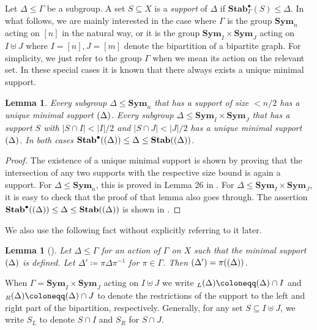 \documentclass[10pt,a4paper]{article}
\theoremstyle{definition}
\theoremstyle{plain}
\newtheorem{lemma}[definition]{Lemma}
\theoremstyle{remark}
\newcommand{\Sym}{\mathbf{Sym}}
\newcommand{\Stab}{\mathbf{Stab}}
\newcommand{\StabP}{\Stab^{\bullet}}
\let\sup\relax
\DeclareMathOperator{\sup}{sup}
\begin{document}
Let $\Delta \leq \Gamma$ be a subgroup. A set $S \subseteq X$
is a \emph{support} of $\Delta$ if $\StabP_\Gamma(S) \leq
\Delta$.  In what follows, we are mainly interested in the
case where $\Gamma$ is the group $\Sym_n$ acting on $[n]$ in
the natural way, or it is the group $\Sym_I \times \Sym_J$
acting on $I \uplus J$ where $I = [n], J = [m]$ denote the bipartition of a bipartite graph.  For
simplicity, we just refer to the group $\Gamma$ when we mean
its action on the relevant set.  In these special cases it is known that there always exists a unique minimal support.
\begin{lemma}
	\label{lem:minSupportExists}
	Every subgroup $\Delta \leq \Sym_n$ that has a support of size $< n/2$ has a unique minimal support  $\sup(\Delta)$.
	Every subgroup $\Delta \leq \Sym_I \times \Sym_J$ that has a support $S$ with $|S \cap I| < |I|/2$ and $|S \cap J| < |J|/2$ has a unique minimal support $\sup(\Delta)$.
	In both cases $\StabP(\sup(\Delta)) \leq \Delta \leq \Stab(\sup(\Delta))$.
\end{lemma}	
\begin{proof}
	The existence of a unique minimal support is shown by proving that the intersection of any two supports with the respective size bound is again a support. For $\Delta \leq \Sym_n$, this is proved in Lemma 26 in \cite{blass1999choiceless}. 
	For $\Delta \leq \Sym_I \times \Sym_J$, it is easy to check that the proof of that lemma also goes through.
	The assertion $\StabP(\sup(\Delta)) \leq \Delta \leq \Stab(\sup(\Delta))$ is shown in \cite{anderson_symmetric_2017}.
\end{proof}	



We also use the following fact without explicitly referring to it later. 
\begin{lemma}[\cite{anderson_symmetric_2017}]
	\label{lem:groupActionOnSupports}
	Let $\Delta \leq \Gamma$ for an action of $\Gamma$ on $X$ such that the minimal support $\sup(\Delta)$ is defined. Let $\Delta' \coloneqq \pi \Delta \pi^{-1}$ for $\pi \in \Gamma$. Then $\sup(\Delta') = \pi(\sup(\Delta))$.
\end{lemma}	
When $\Gamma = \Sym_I \times \Sym_J$ acting on $I \uplus J$
we write $\sup_L(\Delta) \coloneqq \sup(\Delta) \cap I$ and
$\sup_R(\Delta) \coloneqq \sup(\Delta) \cap J$ to denote the
restrictions of the support to the left and right part of the
bipartition, respectively.  Generally, for any set $S \subseteq I \uplus J$, we write $S_L$ to denote $S \cap I$ and $S_R$ for $S \cap J$.
\end{document}
